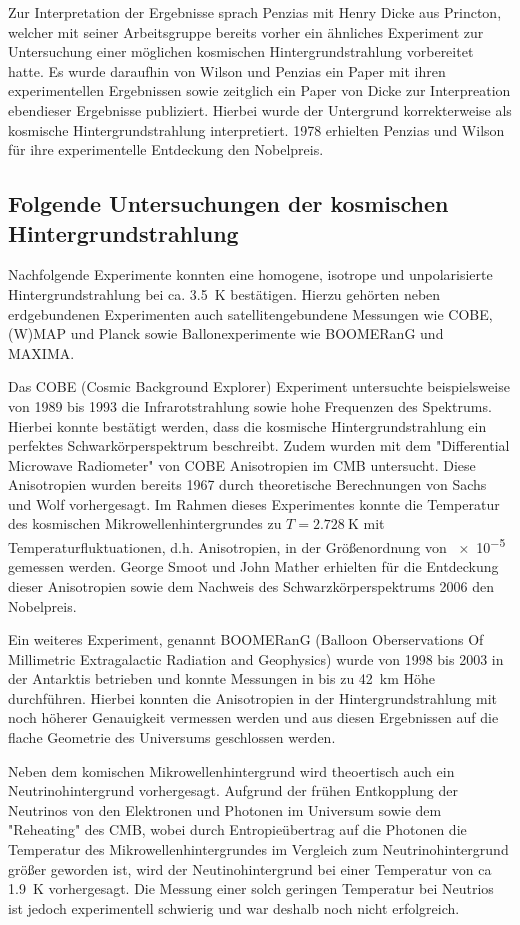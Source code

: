 Zur Interpretation der Ergebnisse sprach Penzias mit Henry Dicke aus Princton, welcher mit seiner Arbeitsgruppe bereits vorher ein ähnliches Experiment zur Untersuchung einer möglichen kosmischen Hintergrundstrahlung vorbereitet hatte.
Es wurde daraufhin von Wilson und Penzias ein Paper mit ihren experimentellen Ergebnissen sowie zeitglich ein Paper von Dicke zur Interpreation ebendieser Ergebnisse publiziert.
Hierbei wurde der Untergrund korrekterweise als kosmische Hintergrundstrahlung interpretiert.
1978 erhielten Penzias und Wilson für ihre experimentelle Entdeckung den Nobelpreis.

\subsection{Folgende Untersuchungen der kosmischen Hintergrundstrahlung}

Nachfolgende Experimente konnten eine homogene, isotrope und unpolarisierte Hintergrundstrahlung bei ca. \SI{3.5}{\kelvin} bestätigen.
Hierzu gehörten neben erdgebundenen Experimenten auch satellitengebundene Messungen wie COBE, (W)MAP und Planck sowie Ballonexperimente wie BOOMERanG und MAXIMA.

Das COBE (Cosmic Background Explorer) Experiment untersuchte beispielsweise von 1989 bis 1993 die Infrarotstrahlung sowie hohe Frequenzen des Spektrums.
Hierbei konnte bestätigt werden, dass die kosmische Hintergrundstrahlung ein perfektes Schwarkörperspektrum beschreibt.
Zudem wurden mit dem "Differential Microwave Radiometer" von COBE Anisotropien im CMB untersucht. 
Diese Anisotropien wurden bereits 1967 durch theoretische Berechnungen von Sachs und Wolf vorhergesagt.
Im Rahmen dieses Experimentes konnte die Temperatur des kosmischen Mikrowellenhintergrundes zu $T = \SI{2.728}{\kelvin}$ mit Temperaturfluktuationen, d.h. Anisotropien, in der Größenordnung von \num{e-5} gemessen werden.
George Smoot und John Mather erhielten für die Entdeckung dieser Anisotropien sowie dem Nachweis des Schwarzkörperspektrums 2006 den Nobelpreis.

Ein weiteres Experiment, genannt BOOMERanG (Balloon Oberservations Of Millimetric Extragalactic Radiation and Geophysics) wurde von 1998 bis 2003 in der Antarktis betrieben und konnte Messungen in bis zu \SI{42}{\kilo\metre} Höhe durchführen.
Hierbei konnten die Anisotropien in der Hintergrundstrahlung mit noch höherer Genauigkeit vermessen werden und aus diesen Ergebnissen auf die flache Geometrie des Universums geschlossen werden.

Neben dem komischen Mikrowellenhintergrund wird theoertisch auch ein Neutrinohintergrund vorhergesagt. Aufgrund der frühen Entkopplung der Neutrinos von den Elektronen und Photonen im Universum sowie dem "Reheating" des CMB, wobei durch Entropieübertrag auf die Photonen die Temperatur des Mikrowellenhintergrundes im Vergleich zum Neutrinohintergrund größer geworden ist, wird der Neutinohintergrund bei einer Temperatur von ca \SI{1.9}{\kelvin} vorhergesagt.
Die Messung einer solch geringen Temperatur bei Neutrios ist jedoch experimentell schwierig und war deshalb noch nicht erfolgreich.